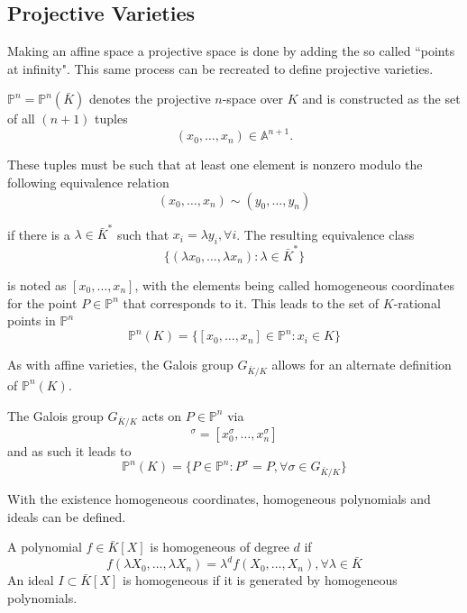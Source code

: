 \subsection{Projective Varieties}
Making an affine space a projective space is done by adding the so called ``points at infinity". This same process can be recreated to define projective varieties.
\begin{defn}
	$\mathbb{P}^n=\mathbb{P}^n(\bar{K})$ denotes the projective $n$-space over $K$ and is constructed as the set of all $(n+1)$ tuples
	\begin{equation*}
	(x_0,\dots,x_n)\in\mathbb{A}^{n+1}.
	\end{equation*}
	
	These tuples must be such that at least one element is nonzero modulo the following equivalence relation
	\begin{equation*}
	(x_0,\dots,x_n)\sim(y_0,\dots,y_n)
	\end{equation*}
	
	if there is a $\lambda\in\bar{K}^*$ such that $x_i=\lambda y_i,\forall i$. The resulting equivalence class
	\begin{equation*}
	\{(\lambda x_0,\dots,\lambda x_n):\lambda\in\bar{K}^*\}
	\end{equation*}
	
	is noted as $[x_0,\dots,x_n]$, with the elements being called homogeneous coordinates for the point $P\in\mathbb{P}^n$ that corresponds to it. This leads to the set of $K$-rational points in $\mathbb{P}^n$
	\begin{equation*}
	\mathbb{P}^n(K)=\{[x_0,\dots,x_n]\in\mathbb{P}^n:x_i\in K\}
	\end{equation*}
\end{defn}
As with affine varieties, the Galois group $G_{\bar{K}/K}$ allows for an alternate definition of $\mathbb{P}^n(K)$.
\begin{rem}
	The Galois group $G_{\bar{K}/K}$ acts on $P\in\mathbb{P}^n$ via
	\begin{equation*}
	[x_0,\dots,x_n]^\sigma=[x_0^\sigma,\dots,x_n^\sigma]
	\end{equation*}
	and as such it leads to
	\begin{equation*}
	\mathbb{P}^n(K)=\{P\in\mathbb{P}^n:P^\sigma=P,\forall\sigma\in G_{\bar{K}/K}\}
	\end{equation*}
\end{rem}

With the existence homogeneous coordinates, homogeneous polynomials and ideals can be defined.
\begin{defn}
	A polynomial $f\in\bar{K}[X]$ is homogeneous of degree $d$ if
	\begin{equation*}
	f(\lambda X_0,\dots,\lambda X_n)=\lambda^df(X_0,\dots,X_n),\forall \lambda\in\bar{K}
	\end{equation*}
	An ideal $I\subset\bar{K}[X]$ is homogeneous if it is generated by homogeneous polynomials.
\end{defn}

